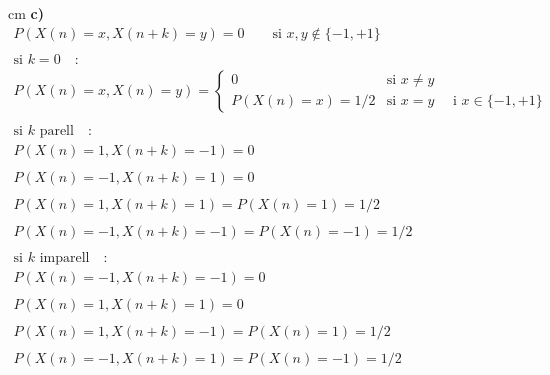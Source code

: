 \documentclass{article}
\begin{document}
 cm
\noindent
\textbf{c)}
\[
\begin{array}{l}
P(X(n) = x, X(n+k)=y) = 0 \qquad \text{si } x, y \notin \{-1, +1\}  \\ \\
\text{si } k= 0 \quad \text{:}\\
P(X(n) = x, X(n)=y) = \begin{cases} 0 & \text{si } x \neq y \\ P(X(n) = x)=1/2 & \text{si } x=y \quad \text{ i } x \in \{-1, +1\} \end{cases}\\ \\
\text{si $k$ parell} \quad \text{:}\\
P(X(n) = 1, X(n+k)=-1) = 0 \\ \\
P(X(n) = -1, X(n+k)=1) = 0 \\ \\
P(X(n) = 1, X(n+k)=1) = P(X(n)=1)=1/2 \\ \\
P(X(n) = -1, X(n+k)=-1) = P(X(n)=-1)=1/2 \\ \\
\text{si $k$ imparell} \quad \text{:}\\
P(X(n) = -1, X(n+k)=-1) = 0 \\ \\
P(X(n) = 1, X(n+k)=1) = 0 \\ \\
P(X(n) = 1, X(n+k)=-1) = P(X(n)=1)=1/2 \\ \\
P(X(n) = -1, X(n+k)=1) = P(X(n)=-1)=1/2 
\end{array}
\]
\end{document}

